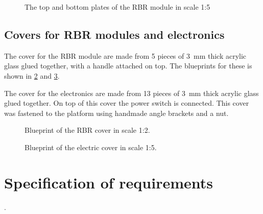 \begin{figure}[htbp]
  \centering
  \caption{The top and bottom plates of the RBR module in scale 1:5}
  \label{fig:appendix-blueprint-rbr-module}
\end{figure}
\subsection{Covers for RBR modules and electronics}

The cover for the RBR module are made from 5 pieces of 3~mm thick acrylic glass
glued together, with a handle attached on top. The blueprints for these is shown in
\cref{fig:appendix-blueprint-rbr-cover} and \cref{fig:appendix-blueprint-electronic-cover}.

The cover for the electronics are made from 13 pieces of 3~mm thick acrylic glass
glued together. On top of this cover the power switch is connected. This cover
was fastened to the platform using handmade angle brackets and a nut.

\begin{figure}[htbp]
  \centering
  \caption{Blueprint of the RBR cover in scale 1:2.}
  \label{fig:appendix-blueprint-rbr-cover}
\end{figure}

\begin{figure}[htbp]
  \centering
  \caption{Blueprint of the electric cover in scale 1:5.}
  \label{fig:appendix-blueprint-electronic-cover}
\end{figure}



\section{Specification of requirements}\label{sec:appendix-b}
.
\label{kravspec}

